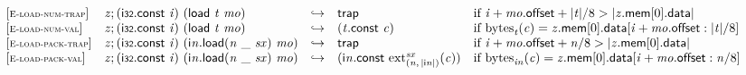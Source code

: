 $$
\begin{array}{@{}l@{}lcl@{}l@{}}
{[\textsc{\scriptsize E{-}load{-}num{-}trap}]} \quad & {\mathit{z}} ; (\mathsf{i{\scriptstyle32}}.\mathsf{const}~{\mathit{i}})~(\mathsf{load}~{\mathit{t}}~{\mathit{mo}}) &\hookrightarrow& \mathsf{trap} &\quad
  \mbox{if}~{\mathit{i}} + {\mathit{mo}}.\mathsf{offset} + {|{\mathit{t}}|} / 8 > {|{{\mathit{z}}.\mathsf{mem}}{{}[0]}.\mathsf{data}|} \\
{[\textsc{\scriptsize E{-}load{-}num{-}val}]} \quad & {\mathit{z}} ; (\mathsf{i{\scriptstyle32}}.\mathsf{const}~{\mathit{i}})~(\mathsf{load}~{\mathit{t}}~{\mathit{mo}}) &\hookrightarrow& ({\mathit{t}}.\mathsf{const}~{\mathit{c}}) &\quad
  \mbox{if}~{{\mathrm{bytes}}}_{{\mathit{t}}}({\mathit{c}}) = {{\mathit{z}}.\mathsf{mem}}{{}[0]}.\mathsf{data}{}[{\mathit{i}} + {\mathit{mo}}.\mathsf{offset} : {|{\mathit{t}}|} / 8] \\
{[\textsc{\scriptsize E{-}load{-}pack{-}trap}]} \quad & {\mathit{z}} ; (\mathsf{i{\scriptstyle32}}.\mathsf{const}~{\mathit{i}})~({{\mathsf{i}}{{\mathit{n}}}.\mathsf{load}}{({\mathit{n}}~\mathsf{\_}~{\mathit{sx}})}~{\mathit{mo}}) &\hookrightarrow& \mathsf{trap} &\quad
  \mbox{if}~{\mathit{i}} + {\mathit{mo}}.\mathsf{offset} + {\mathit{n}} / 8 > {|{{\mathit{z}}.\mathsf{mem}}{{}[0]}.\mathsf{data}|} \\
{[\textsc{\scriptsize E{-}load{-}pack{-}val}]} \quad & {\mathit{z}} ; (\mathsf{i{\scriptstyle32}}.\mathsf{const}~{\mathit{i}})~({{\mathsf{i}}{{\mathit{n}}}.\mathsf{load}}{({\mathit{n}}~\mathsf{\_}~{\mathit{sx}})}~{\mathit{mo}}) &\hookrightarrow& ({\mathsf{i}}{{\mathit{n}}}.\mathsf{const}~{{{{\mathrm{ext}}}_{({\mathit{n}},\, {|{\mathsf{i}}{{\mathit{n}}}|})}^{{\mathit{sx}}}}}{({\mathit{c}})}) &\quad
  \mbox{if}~{{\mathrm{bytes}}}_{{{\mathit{i}}}{{\mathit{n}}}}({\mathit{c}}) = {{\mathit{z}}.\mathsf{mem}}{{}[0]}.\mathsf{data}{}[{\mathit{i}} + {\mathit{mo}}.\mathsf{offset} : {\mathit{n}} / 8] \\
\end{array}
$$

\vspace{1ex}

